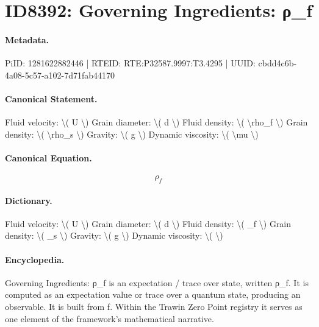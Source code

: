 \section*{ID8392: Governing Ingredients: ρ\_f}
\paragraph{Metadata.}
PiID: 1281622882446 | RTEID: RTE:P32587.9997:T3.4295 | UUID: cbdd4c6b-4a08-5c57-a102-7d71fab44170

\paragraph{Canonical Statement.}
Fluid velocity: \textbackslash{}( U \textbackslash{}) Grain diameter: \textbackslash{}( d \textbackslash{}) Fluid density: \textbackslash{}( \textbackslash{}rho\_f \textbackslash{}) Grain density: \textbackslash{}( \textbackslash{}rho\_s \textbackslash{}) Gravity: \textbackslash{}( g \textbackslash{}) Dynamic viscosity: \textbackslash{}( \textbackslash{}mu \textbackslash{})

\paragraph{Canonical Equation.}
\[
\rho_f
\]

\paragraph{Dictionary.}
Fluid velocity: \textbackslash{}( U \textbackslash{}) Grain diameter: \textbackslash{}( d \textbackslash{}) Fluid density: \textbackslash{}( \_f \textbackslash{}) Grain density: \textbackslash{}( \_s \textbackslash{}) Gravity: \textbackslash{}( g \textbackslash{}) Dynamic viscosity: \textbackslash{}( \textbackslash{})

\paragraph{Encyclopedia.}
Governing Ingredients: ρ\_f is an expectation / trace over state, written ρ\_f. It is computed as an expectation value or trace over a quantum state, producing an observable. It is built from f. Within the Trawin Zero Point registry it serves as one element of the framework's mathematical narrative.
